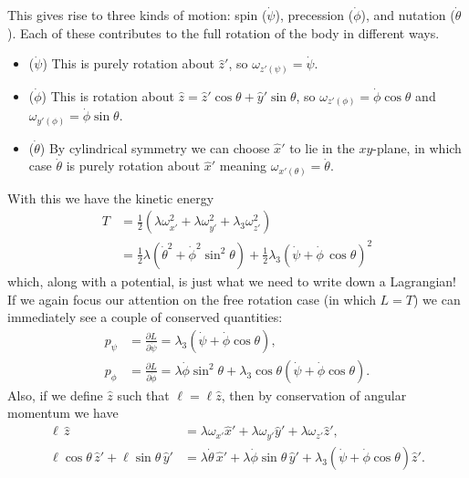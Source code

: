 \documentclass[../p111main.tex]{subfiles}
\begin{document}
This gives rise to three kinds of motion: spin ($\dot \psi$), precession ($\dot \phi$), and nutation ($\dot \theta$).
Each of these contributes to the full rotation of the body in different ways.
\begin{itemize}[topsep=0pt]
    \item ($\dot \psi$)
    This is purely rotation about $\hat z'$, so $\omega_{z' (\psi)} = \dot \psi$.
    
    \item ($\dot \phi$)
    This is rotation about $\hat z = \hat z' \cos \theta + \hat y' \sin \theta$, so $\omega_{z'(\phi)} = \dot \phi \cos \theta$ and $\omega_{y'(\phi)} = \dot \phi \sin \theta$.
    
    \item ($\dot \theta$)
    By cylindrical symmetry we can choose $\hat x'$ to lie in the $xy$-plane, in which case $\dot \theta$ is purely rotation about $\hat x'$ meaning $\omega_{x'(\theta)} = \dot \theta$.
\end{itemize}
With this we have the kinetic energy
\begin{align*}
    T &= \frac{1}{2} \left( \lambda \omega_{x'}^2 + \lambda \omega_{y'}^2 + \lambda_3 \omega_{z'}^2 \right) \\
    &= \frac{1}{2} \lambda \left( \dot \theta^2 + \dot \phi^2 \sin^2 \theta \right) + \frac{1}{2} \lambda_3 \left( \dot \psi + \dot \phi \, \cos \theta \right)^2
\end{align*}
which, along with a potential, is just what we need to write down a Lagrangian!
If we again focus our attention on the free rotation case (in which $L = T$) we can immediately see a couple of conserved quantities:
\begin{align*}
    p_\psi &= \frac{\partial L}{\partial \dot \psi} = \lambda_3 \left( \dot \psi + \dot \phi \cos \theta \right), \\
    p_\phi &= \frac{\partial L}{\partial \dot \phi} = \lambda \dot \phi \sin^2 \theta + \lambda_3 \cos \theta \left( \dot \psi + \dot \phi \cos \theta \right).
\end{align*}
Also, if we define $\hat z$ such that $\bm \ell  = \ell \hat z$, then by conservation of angular momentum we have
\begin{align*}
    \ell \, \hat z &= \lambda \omega_{x'} \hat x' + \lambda \omega_{y'} \hat y' + \lambda \omega_{z'} \hat z', \\
    \ell \cos \theta \,\hat z' + \ell \sin \theta \,\hat y' &= \lambda \dot \theta \,\hat x' + \lambda \dot \phi \sin \theta \,\hat y' + \lambda_3 (\dot \psi + \dot \phi \cos \theta) \hat z'.
\end{align*}
\end{document}
